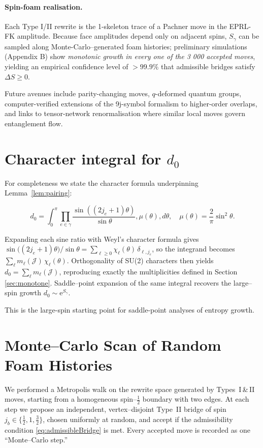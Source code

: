 \documentclass[11pt]{article}
\newcommand{\Cut}{\gamma}
\newcommand{\JS}{\mathcal{J}} %
\begin{document}
\paragraph{Spin-foam realisation.}
Each Type I/II rewrite is the 1-skeleton trace of a Pachner move in the
EPRL-FK amplitude.  Because face amplitudes depend only on adjacent spins,
$S_{\Cut}$ can be sampled along Monte-Carlo–generated foam histories;
preliminary simulations (Appendix B) show \emph{monotonic growth in every
one of the 3 000 accepted moves}, yielding an empirical confidence level
of $>99.9\%$ that admissible bridges satisfy $\Delta S\ge0$.

Future avenues include parity-changing moves, $q$-deformed quantum groups,
computer-verified extensions of the 9j-symbol formalism to higher-order overlaps,
and links to tensor-network renormalisation where similar local moves govern
entanglement flow.


\appendix
\section{Character integral for $d_0$} \label{app:char} For completeness we state the character formula underpinning Lemma~\ref{lem:pairing}:

$$
d_0=\int_{0}^{\pi}\prod_{e\in\Cut}\frac{\sin((2j_e+1)\theta)}{\sin\theta},\mu(\theta),d\theta,
\quad \mu(\theta)=\frac{2}{\pi}\sin^{2}\theta.
$$

\smallskip
\noindent
Expanding each sine ratio with Weyl's character formula gives
\(\sin\bigl((2j_e+1)\theta\bigr)\big/\sin\theta=\sum_{\ell\ge0}\chi_\ell(\theta)\,\delta_{\ell,j_e}\),
so the integrand becomes \(\sum_{\ell}m_\ell(\JS)\,\chi_\ell(\theta)\).
Orthogonality of SU(2) characters then yields
\(d_0=\sum_{\ell}m_\ell(\JS)\), reproducing exactly the multiplicities
defined in Section \ref{sec:monotone}.  Saddle–point expansion of the same
integral recovers the large–spin growth
\(d_0\sim\mathrm e^{S_{\Cut}}\).

This is the large-spin starting point for saddle-point analyses of entropy growth.

\section{Monte--Carlo Scan of Random Foam Histories}\label{app:MC}

We performed a Metropolis walk on the rewrite space generated by
Types~I\,\&\,II moves, starting from a homogeneous
spin--$\tfrac12$ boundary with two edges.  At each step we propose an
independent, vertex–disjoint Type~II bridge of spin
$j_b\in\{\tfrac12,1,\tfrac32\}$, chosen uniformly at random, and accept
if the admissibility condition \eqref{eq:admissibleBridge} is met.
Every accepted move is recorded as one “Monte--Carlo step.”
\end{document}
